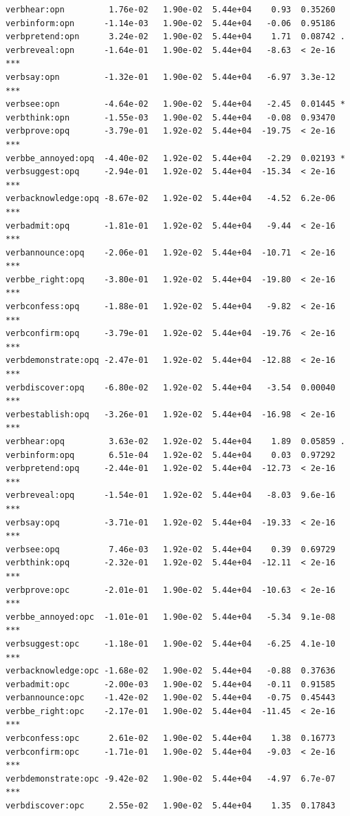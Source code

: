 \documentclass[10pt]{article}\usepackage[]{graphicx}\usepackage[]{color}
\makeatletter
\newenvironment{kframe}{%
 \def\at@end@of@kframe{}%
 \ifinner\ifhmode%
  \def\at@end@of@kframe{\end{minipage}}%
  \begin{minipage}{\columnwidth}%
 \fi\fi%
 \def\FrameCommand##1{\hskip\@totalleftmargin \hskip-\fboxsep
 \colorbox{shadecolor}{##1}\hskip-\fboxsep
     \hskip-\linewidth \hskip-\@totalleftmargin \hskip\columnwidth}%
 \MakeFramed {\advance\hsize-\width
   \@totalleftmargin\z@ \linewidth\hsize
   \@setminipage}}%
 {\par\unskip\endMakeFramed%
 \at@end@of@kframe}
\newenvironment{knitrout}{}{} %
\makeatother
\begin{document}
\begin{knitrout}
\begin{kframe}
\begin{verbatim}
verbhear:opn         1.76e-02   1.90e-02  5.44e+04    0.93  0.35260    
verbinform:opn      -1.14e-03   1.90e-02  5.44e+04   -0.06  0.95186    
verbpretend:opn      3.24e-02   1.90e-02  5.44e+04    1.71  0.08742 .  
verbreveal:opn      -1.64e-01   1.90e-02  5.44e+04   -8.63  < 2e-16 ***
verbsay:opn         -1.32e-01   1.90e-02  5.44e+04   -6.97  3.3e-12 ***
verbsee:opn         -4.64e-02   1.90e-02  5.44e+04   -2.45  0.01445 *  
verbthink:opn       -1.55e-03   1.90e-02  5.44e+04   -0.08  0.93470    
verbprove:opq       -3.79e-01   1.92e-02  5.44e+04  -19.75  < 2e-16 ***
verbbe_annoyed:opq  -4.40e-02   1.92e-02  5.44e+04   -2.29  0.02193 *  
verbsuggest:opq     -2.94e-01   1.92e-02  5.44e+04  -15.34  < 2e-16 ***
verbacknowledge:opq -8.67e-02   1.92e-02  5.44e+04   -4.52  6.2e-06 ***
verbadmit:opq       -1.81e-01   1.92e-02  5.44e+04   -9.44  < 2e-16 ***
verbannounce:opq    -2.06e-01   1.92e-02  5.44e+04  -10.71  < 2e-16 ***
verbbe_right:opq    -3.80e-01   1.92e-02  5.44e+04  -19.80  < 2e-16 ***
verbconfess:opq     -1.88e-01   1.92e-02  5.44e+04   -9.82  < 2e-16 ***
verbconfirm:opq     -3.79e-01   1.92e-02  5.44e+04  -19.76  < 2e-16 ***
verbdemonstrate:opq -2.47e-01   1.92e-02  5.44e+04  -12.88  < 2e-16 ***
verbdiscover:opq    -6.80e-02   1.92e-02  5.44e+04   -3.54  0.00040 ***
verbestablish:opq   -3.26e-01   1.92e-02  5.44e+04  -16.98  < 2e-16 ***
verbhear:opq         3.63e-02   1.92e-02  5.44e+04    1.89  0.05859 .  
verbinform:opq       6.51e-04   1.92e-02  5.44e+04    0.03  0.97292    
verbpretend:opq     -2.44e-01   1.92e-02  5.44e+04  -12.73  < 2e-16 ***
verbreveal:opq      -1.54e-01   1.92e-02  5.44e+04   -8.03  9.6e-16 ***
verbsay:opq         -3.71e-01   1.92e-02  5.44e+04  -19.33  < 2e-16 ***
verbsee:opq          7.46e-03   1.92e-02  5.44e+04    0.39  0.69729    
verbthink:opq       -2.32e-01   1.92e-02  5.44e+04  -12.11  < 2e-16 ***
verbprove:opc       -2.01e-01   1.90e-02  5.44e+04  -10.63  < 2e-16 ***
verbbe_annoyed:opc  -1.01e-01   1.90e-02  5.44e+04   -5.34  9.1e-08 ***
verbsuggest:opc     -1.18e-01   1.90e-02  5.44e+04   -6.25  4.1e-10 ***
verbacknowledge:opc -1.68e-02   1.90e-02  5.44e+04   -0.88  0.37636    
verbadmit:opc       -2.00e-03   1.90e-02  5.44e+04   -0.11  0.91585    
verbannounce:opc    -1.42e-02   1.90e-02  5.44e+04   -0.75  0.45443    
verbbe_right:opc    -2.17e-01   1.90e-02  5.44e+04  -11.45  < 2e-16 ***
verbconfess:opc      2.61e-02   1.90e-02  5.44e+04    1.38  0.16773    
verbconfirm:opc     -1.71e-01   1.90e-02  5.44e+04   -9.03  < 2e-16 ***
verbdemonstrate:opc -9.42e-02   1.90e-02  5.44e+04   -4.97  6.7e-07 ***
verbdiscover:opc     2.55e-02   1.90e-02  5.44e+04    1.35  0.17843    

\end{verbatim}
\end{kframe}
\end{knitrout}
\end{document}
